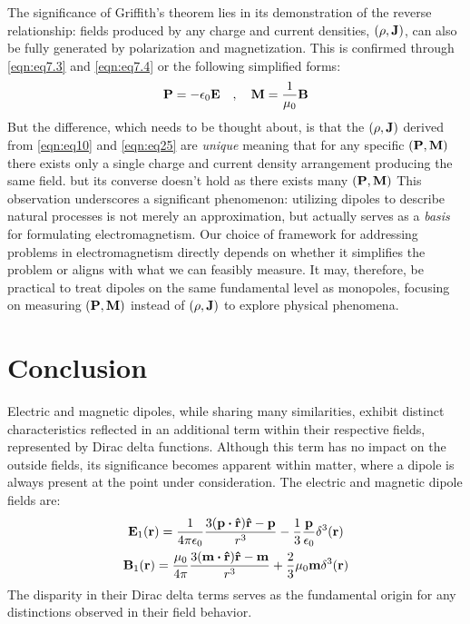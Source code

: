 \documentclass{article}
\numberwithin{equation}{section}
\begin{document}
The significance of Griffith's theorem lies in its demonstration of the reverse relationship: fields produced by any charge and current densities, $(\rho,\vb{J})$, can also be fully generated by polarization and magnetization. This is confirmed through \eqref{eqn:eq7.3} and \eqref{eqn:eq7.4} or the following simplified forms:
$$\vb{P}=-\epsilon_0\vb{E}\quad,\quad\vb{M}=\frac{1}{\mu_0}\vb{B}$$
But the difference, which needs to be thought about, is that the $(\rho,\vb{J})$ derived from \eqref{eqn:eq10} and \eqref{eqn:eq25} are \textit{unique} meaning that for any specific $(\vb{P},\vb{M})$ there exists only a single charge and current density arrangement producing the same field. but its converse doesn't hold as there exists many $(\vb{P},\vb{M})$
This observation underscores a significant phenomenon: utilizing dipoles to describe natural processes is not merely an approximation, but actually serves as a \textit{basis} for formulating electromagnetism. Our choice of framework for addressing problems in electromagnetism directly depends on whether it simplifies the problem or aligns with what we can feasibly measure. It may, therefore, be practical to treat dipoles on the same fundamental level as monopoles, focusing on measuring $(\vb{P},\vb{M})$ instead of $(\rho,\vb{J})$ to explore physical phenomena.




\section{Conclusion}
Electric and magnetic dipoles, while sharing many similarities, exhibit distinct characteristics reflected in an additional term within their respective fields, represented by Dirac delta functions. Although this term has no impact on the outside fields, its significance becomes apparent within matter, where a dipole is always present at the point under consideration. The electric and magnetic dipole fields are:
\begin{gather}
\vb{E}_1(\vb{r})=\frac{1}{4\pi\epsilon_0}\frac{3(\vb{p}\vdot\vu{r})\vu{r}-\vb{p}}{r^3}-\frac{1}{3}\frac{\vb{p}}{\epsilon_0} \delta^3(\vb{r})\nonumber\\\vb{B}_1(\vb{r})=\frac{\mu_0}{4\pi}\frac{3(\vb{m}\vdot\vu{r})\vu{r}-\vb{m}}{r^3}+\frac{2}{3}\mu_0 \vb{m} \delta^3(\vb{r})\nonumber
\end{gather}
The disparity in their Dirac delta terms serves as the fundamental origin for any distinctions observed in their field behavior.\cite{book:925320}



\end{document}
